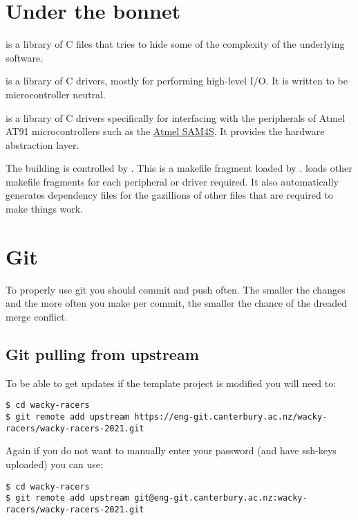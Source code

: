 \section{Under the bonnet}
\label{under-the-bonnet}

 is a library of C files that tries to hide some of the
complexity of the underlying software.

 is a library of C drivers, mostly for performing high-level I/O.
It is written to be microcontroller neutral.

 is a library of C drivers specifically for interfacing with the
peripherals of Atmel AT91 microcontrollers such as the
\href{Atmel_SAM4S}{Atmel SAM4S}. It provides the hardware abstraction
layer.

The building is controlled by . This is a
makefile fragment loaded by .
 loads other makefile fragments for each
peripheral or driver required. It also automatically generates
dependency files for the gazillions of other files that are required to
make things work.

\section{Git}
\label{git}

To properly use git you should commit and push often. The smaller the
changes and the more often you make per commit, the smaller the chance
of the dreaded merge conflict.

\subsection{Git pulling from upstream}
\label{git-pulling-from-upstream}

To be able to get updates if the template project is modified you will
need to:

\begin{verbatim}
$ cd wacky-racers 
$ git remote add upstream https://eng-git.canterbury.ac.nz/wacky-racers/wacky-racers-2021.git  
\end{verbatim}

Again if you do not want to manually enter your password (and have
ssh-keys uploaded) you can use:
%
\begin{verbatim}
$ cd wacky-racers 
$ git remote add upstream git@eng-git.canterbury.ac.nz:wacky-racers/wacky-racers-2021.git
\end{verbatim}

